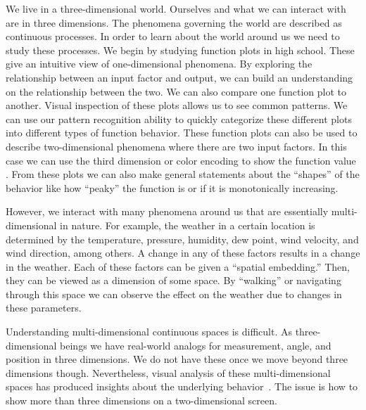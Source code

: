 
We live in a three-dimensional world. 
Ourselves and what we can interact with are in three dimensions.
The phenomena governing the world are described as continuous processes.
In order to learn about the world around us we need to study these processes.
We begin by studying function plots in high 
school. These give an intuitive view of one-dimensional 
phenomena. 
By exploring the relationship
between an input factor
and output,
we can build an understanding on the relationship between the two.
We can also compare one function plot to another. Visual inspection of these plots
allows us to see common patterns. We can use our pattern recognition ability
to quickly categorize these different plots into different types of function
behavior. These function plots can also be used to describe two-dimensional
phenomena where there are two input factors. In this case we can use the third
dimension or color encoding to show the function value . 
From these plots we can also make general statements about the ``shapes'' of
the behavior like how ``peaky'' the function is or if it is monotonically
increasing. 

However, we interact with many phenomena around us that are essentially
multi-dimensional in nature. For example, the weather in a certain location is
determined by the temperature, pressure, humidity, dew point, wind velocity,
and wind direction, among others. A change in any of these factors results in a
change in the weather. Each of these factors can be given a ``spatial
embedding.'' Then, they can be viewed as a dimension of some space.  By
``walking'' or navigating through this space we can observe the effect on the
weather due to changes in these parameters. 

Understanding multi-dimensional continuous spaces is difficult. As
three-dimensional beings we have real-world analogs for measurement,
angle, and position in three dimensions. We do not have these once we
move beyond three dimensions though. Nevertheless, visual analysis of
these multi-dimensional spaces has produced insights about the
underlying behavior~\cite{Sedlmair:2014}. The issue is how to show more
than three dimensions on a two-dimensional screen. 

